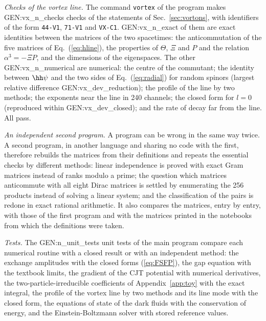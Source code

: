 \emph{Checks of the vortex line.} The command \texttt{vortex} of the program makes
{{GEN:vx_n_checks}} checks of the statements of Sec.~\ref{sec:vortons}, with identifiers of the form
\texttt{44-V1}, \texttt{71-V1} and \texttt{VX-C1}. {{GEN:vx_n_exact}} of them are exact identities
between the matrices of the two spacetimes: the anticommutation of the five matrices of
Eq.~(\ref{eq:hline}), the properties of $\Theta$, $\Xi$ and $P$ and the relation $\alpha^3=-\Xi P$,
and the dimensions of the eigenspaces. The other {{GEN:vx_n_numerical}} are numerical: the centre
of the commutant; the identity between $\hh\psi$ and the two sides of Eq.~(\ref{eq:radial}) for
random spinors (largest relative difference {{GEN:vx_dev_reduction}}); the profile of the line by
two methods; the exponents near the line in 240 channels; the closed form for $l=0$ (reproduced
within {{GEN:vx_dev_closed}}); and the rate of decay far from the line. All pass.

\emph{An independent second program.} A program can be wrong in the same way twice. A second
program, in another language and sharing no code with the first, therefore rebuilds the matrices
from their definitions and repeats the essential checks by different methods: linear independence
is proved with exact Gram matrices instead of ranks modulo a prime; the question which matrices
anticommute with all eight Dirac matrices is settled by enumerating the 256 products instead of
solving a linear system; and the classification of the pairs is redone in exact rational
arithmetic. It also compares the matrices, entry by entry, with those of the first program and with
the matrices printed in the notebooks from which the definitions were taken.

\emph{Tests.} The {{GEN:n_unit_tests}} unit tests of the main program compare each numerical
routine with a closed result or with an independent method: the exchange amplitudes with the closed
forms (\ref{eq:FSFP}), the gap equation with the textbook limits, the gradient of the CJT potential
with numerical derivatives, the two-particle-irreducible coefficients of Appendix~\ref{app:toy} with
the exact integral, the profile of the vortex line by two methods and its line mode with the closed
form, the equations of state of the dark fluids with the conservation of energy, and
the Einstein-Boltzmann solver with stored reference values.

